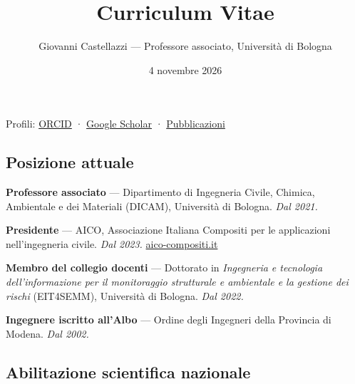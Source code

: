 \documentclass[
  italian,
  10pt,
  a4paper,
  DIV=11,
  numbers=noendperiod]{scrartcl}
\title{Curriculum Vitae}
\subtitle{Giovanni Castellazzi --- Professore associato, Università di
Bologna}
\author{}
\date{4 novembre 2026}
\renewcommand*\contentsname{Indice}
\newcommand\contentsname{Indice}
\begin{document}
\maketitle

\renewcommand*\contentsname{Indice}
{
\setcounter{tocdepth}{2}
\tableofcontents
}

\begin{tcolorbox}[enhanced jigsaw, arc=.35mm, bottomrule=.15mm, breakable, colback=white, colframe=quarto-callout-note-color-frame, left=2mm, leftrule=.75mm, opacityback=0, rightrule=.15mm, toprule=.15mm]
\begin{minipage}[t]{5.5mm}
\textcolor{quarto-callout-note-color}{\faInfo}
\end{minipage}%
\begin{minipage}[t]{\textwidth - 5.5mm}

Profili: \href{https://orcid.org/0000-0001-5870-5474}{ORCID} ·
\href{https://scholar.google.com/citations?user=pPopX2QAAAAJ&hl=it}{Google
Scholar} ·
\href{https://gcastellazzi.github.io/publications.html}{Pubblicazioni}

\end{minipage}%
\end{tcolorbox}

\subsection{Posizione attuale}\label{posizione-attuale}

\textbf{Professore associato} --- Dipartimento di Ingegneria Civile,
Chimica, Ambientale e dei Materiali (DICAM), Università di Bologna.
\emph{Dal 2021.}

\textbf{Presidente} --- AICO, Associazione Italiana Compositi per le
applicazioni nell'ingegneria civile. \emph{Dal 2023.}
\href{https://www.aico-compositi.it}{aico-compositi.it}

\textbf{Membro del collegio docenti} --- Dottorato in \emph{Ingegneria e
tecnologia dell'informazione per il monitoraggio strutturale e
ambientale e la gestione dei rischi} (EIT4SEMM), Università di Bologna.
\emph{Dal 2022.}

\textbf{Ingegnere iscritto all'Albo} --- Ordine degli Ingegneri della
Provincia di Modena. \emph{Dal 2002.}

\subsection{Abilitazione scientifica
nazionale}\label{abilitazione-scientifica-nazionale}
\end{document}
